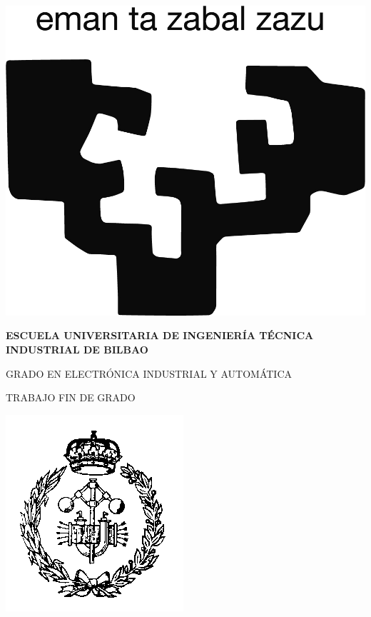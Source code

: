 %

\begin{minipage}{.1125\textwidth}
\centering\includegraphics[width=.95\textwidth]{./images/ehu.png}
\end{minipage}
\begin{minipage}{.7\textwidth}
\begin{center}
{\bfseries ESCUELA UNIVERSITARIA DE INGENIERÍA TÉCNICA INDUSTRIAL DE BILBAO}

\vspace{5pt}
\scriptsize GRADO EN ELECTRÓNICA INDUSTRIAL Y AUTOMÁTICA

\vspace{5pt}
TRABAJO FIN DE GRADO
\end{center}
\end{minipage}
\begin{minipage}{.1125\textwidth}
\centering\includegraphics[width=.95\textwidth]{./images/euiti.png}\vspace{5pt}
\end{minipage}
